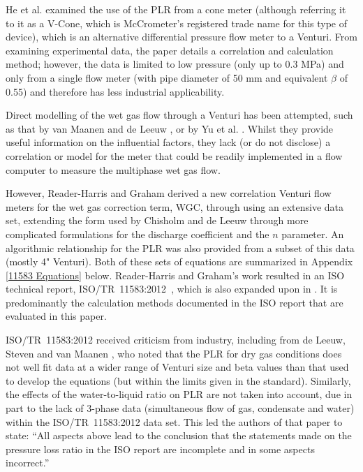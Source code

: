 \documentclass[journal]{IEEEtran}
\begin{document}
He et al. \cite{He2016} examined the use of the PLR from a cone meter (although referring it to it as a V-Cone, which is McCrometer's registered trade name for this type of device), which is an alternative differential pressure flow meter to a Venturi.  From examining experimental data, the paper details a correlation and calculation method; however, the data is limited to low pressure (only up to 0.3 MPa) and only from a single flow meter (with pipe diameter of 50 mm and equivalent $\beta$ of 0.55) and therefore has less industrial applicability.

Direct modelling of the wet gas flow through a Venturi has been attempted, such as that by van Maanen and de Leeuw \cite{VanMaanen2016}, or by Yu et al. \cite{Yu2015}.  Whilst they provide useful information on the influential factors, they lack (or do not disclose) a correlation or model for the meter that could be readily implemented in a flow computer to measure the multiphase wet gas flow.

However, Reader-Harris and Graham \cite{Reader-Harris2009} derived a new correlation Venturi flow meters for the wet gas correction term, \acrshort{WGC}, through using an extensive data set, extending the form used by Chisholm \cite{Chisholm1977} and de Leeuw \cite{DeLeeuw1997} through more complicated formulations for the discharge coefficient and the $n$ parameter.  An algorithmic relationship for the \acrshort{PLR} was also provided from a subset of this data (mostly 4" Venturi).  Both of these sets of equations are summarized in Appendix \ref{11583 Equations} below. Reader-Harris and Graham's work resulted in an ISO technical report, ISO/TR~11583:2012~\cite{2012ISO/TRConduits}, which is also expanded upon in \cite{Reader-Harris2015}.  It is predominantly the calculation methods documented in the ISO report that are evaluated in this paper.

ISO/TR~11583:2012 received criticism from industry, including from de Leeuw, Steven and van Maanen \cite{DeLeeuw2011}, who noted that the \acrlong{PLR} for dry gas conditions does not well fit data at a wider range of Venturi size and \acrshort{beta} values than that used to develop the equations (but within the limits given in the standard).  Similarly, the effects of the water-to-liquid ratio on  \acrshort{PLR} are not taken into account, due in part to the lack of 3-phase data (simultaneous flow of gas, condensate and water) within the ISO/TR~11583:2012 data set.  This led the authors of that paper to state: ``All aspects above lead to the conclusion that the statements made on the pressure loss ratio in the ISO report are incomplete and in some aspects incorrect.'' 
\end{document}
